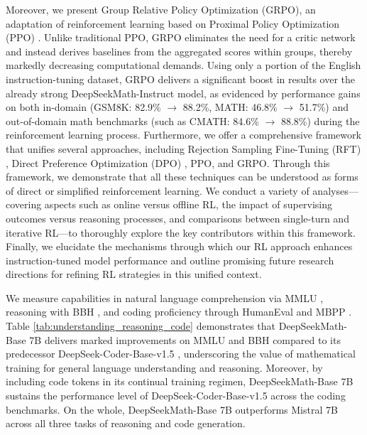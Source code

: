 \begin{itemize}[topsep=0pt]
Moreover, we present Group Relative Policy Optimization (GRPO), an adaptation of reinforcement learning based on Proximal Policy Optimization (PPO) \citep{schulman2017proximal}. Unlike traditional PPO, GRPO eliminates the need for a critic network and instead derives baselines from the aggregated scores within groups, thereby markedly decreasing computational demands. Using only a portion of the English instruction-tuning dataset, GRPO delivers a significant boost in results over the already strong DeepSeekMath-Instruct model, as evidenced by performance gains on both in-domain (GSM8K: 82.9\% $\rightarrow$ 88.2\%, MATH: 46.8\% $\rightarrow$ 51.7\%) and out-of-domain math benchmarks (such as CMATH: 84.6\% $\rightarrow$ 88.8\%) during the reinforcement learning process. Furthermore, we offer a comprehensive framework that unifies several approaches, including Rejection Sampling Fine-Tuning (RFT) \citep{yuan2023scaling}, Direct Preference Optimization (DPO) \citep{dpo}, PPO, and GRPO. Through this framework, we demonstrate that all these techniques can be understood as forms of direct or simplified reinforcement learning. We conduct a variety of analyses—covering aspects such as online versus offline RL, the impact of supervising outcomes versus reasoning processes, and comparisons between single-turn and iterative RL—to thoroughly explore the key contributors within this framework. Finally, we elucidate the mechanisms through which our RL approach enhances instruction-tuned model performance and outline promising future research directions for refining RL strategies in this unified context.

We measure capabilities in natural language comprehension via MMLU \citep{mmlu}, reasoning with BBH \citep{bbh}, and coding proficiency through HumanEval \citep{codex} and MBPP \citep{mbpp}. Table \ref{tab:understanding_reasoning_code} demonstrates that DeepSeekMath-Base 7B delivers marked improvements on MMLU and BBH compared to its predecessor DeepSeek-Coder-Base-v1.5 \citep{deepseek-coder}, underscoring the value of mathematical training for general language understanding and reasoning. Moreover, by including code tokens in its continual training regimen, DeepSeekMath-Base 7B sustains the performance level of DeepSeek-Coder-Base-v1.5 across the coding benchmarks. On the whole, DeepSeekMath-Base 7B outperforms Mistral 7B \citep{mistral} across all three tasks of reasoning and code generation.


\end{itemize}
